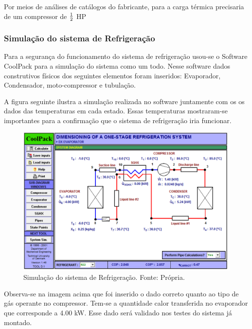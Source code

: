             Por meios de análises de catálogos do fabricante, para a carga térmica
            precisaria de um compressor de $1 \over 2$ HP

            \subsubsection[Simulação do sistema de Refrigeração]{Simulação do sistema de Refrigeração}
                Para a segurança do funcionamento do sistema de refrigeração usou-se o
                Software CoolPack para a simulação do sistema como um todo. Nesse software dados
                construtivos físicos dos seguintes elementos foram inseridos: Evaporador,
                Condensador, moto-compressor e tubulação.
                
                A figura seguinte ilustra a simulação realizada no software juntamente com os os
                dados das temperaturas em cada estado. Essas temperaturas mostraram-se
                importantes para a confirmação que o sistema de refrigeração iria funcionar.

                \begin{figure}[!htb]
            		\centering
            		\includegraphics[scale= 0.3]{figuras/simulacao-refrigeracao.png}
            		\caption{Simulação do sistema de Refrigeração. Fonte: Própria.}
            		\label{simulacao-refrigeracao}
                \end{figure}
                
                Observa-se na imagem acima que foi inserido o dado correto quanto ao
                tipo de gás operante no compressor. Tem-se a quantidade calor transferida no
                evaporador que corresponde a 4.00 kW. Esse dado será validado nos testes do
                sistema já montado.
        
